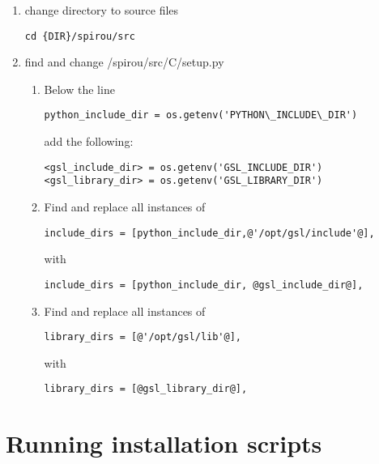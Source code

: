 \begin{enumerate}
\item change directory to source files
\begin{lstlisting}[style=bashstyle]
cd {DIR}/spirou/src
\end{lstlisting}


\item find and change /spirou/src/C/setup.py

\begin{enumerate}
\item Below the line
\begin{lstlisting}[style=text]
python_include_dir = os.getenv('PYTHON\_INCLUDE\_DIR') 
\end{lstlisting}
add the following:
\begin{lstlisting}[style=text]
<gsl_include_dir> = os.getenv('GSL_INCLUDE_DIR')
<gsl_library_dir> = os.getenv('GSL_LIBRARY_DIR')
\end{lstlisting}

\item Find and replace all instances of
\begin{lstlisting}[style=text]
include_dirs = [python_include_dir,@'/opt/gsl/include'@],
\end{lstlisting}

with
\begin{lstlisting}[style=text]
include_dirs = [python_include_dir, @gsl_include_dir@],
\end{lstlisting}

\item Find and replace all instances of 
\begin{lstlisting}[style=text]
library_dirs = [@'/opt/gsl/lib'@],  
\end{lstlisting}

with
\begin{lstlisting}[style=text]
library_dirs = [@gsl_library_dir@],
\end{lstlisting}

\end{enumerate}

\end{enumerate}

\section{Running installation scripts}
\label{section:running_install_Scripts}

